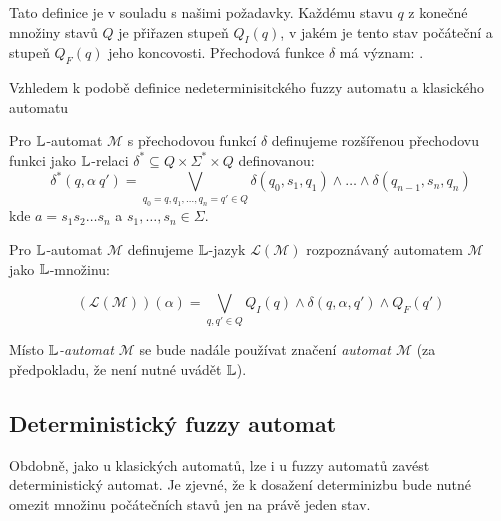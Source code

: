 \documentclass[a4paper,10pt]{article}
\begin{document}
Tato definice je v souladu s našimi požadavky. Každému stavu $q$ z konečné množiny stavů $Q$ je přiřazen stupeň $Q_I(q)$, v jakém je tento stav počáteční a stupeň $Q_F(q)$ jeho koncovosti. Přechodová funkce $\delta$ má význam: .

Vzhledem k podobě definice nedeterminisitckého fuzzy automatu a klasického automatu 



\begin{definition}\label{extended-transit-function}
 Pro $\mathbb{L}$-automat $\mathcal{M}$ s přechodovou funkcí $\delta$ definujeme rozšířenou přechodovu funkci jako $\mathbb{L}$-relaci $\delta^* \subseteq Q \times \Sigma^* \times Q$ definovanou:
 $$
  \delta^*(q, \alpha\ q') = \bigvee_{q_0 = q, q_1, \dots, q_n = q' \in Q} \delta(q_0, s_1, q_1) \wedge \dots \wedge \delta(q_{n-1}, s_n, q_n)
 $$
 kde $a = s_1s_2\dots s_n$ a $s_1, \dots, s_n \in \Sigma$.
\end{definition}



\begin{definition}\label{language-recognized-by-automata}
 Pro $\mathbb{L}$-automat $\mathcal{M}$ definujeme $\mathbb{L}$-jazyk $\mathcal{L}(\mathcal{M})$ rozpoznávaný automatem $\mathcal{M}$ jako $\mathbb{L}$-množinu:
 
 $$
 (\mathcal{L}(\mathcal{M}))(\alpha) = \bigvee_{q, q' \in Q} Q_I(q) \wedge \delta(q, \alpha, q') \wedge Q_F(q')
 $$
\end{definition}


\begin{note}
  Místo \textit{$\mathbb{L}$-automat $\mathcal{M}$} se bude nadále používat značení \textit{automat $\mathcal{M}$} (za předpokladu, že není nutné uvádět $\mathbb{L}$).
\end{note}



\subsection{Deterministický fuzzy automat}
Obdobně, jako u klasických automatů, lze i u fuzzy automatů zavést deterministický automat. Je zjevné, že k dosažení determinizbu bude nutné omezit množinu počátečních stavů jen na právě jeden stav.
\end{document}
